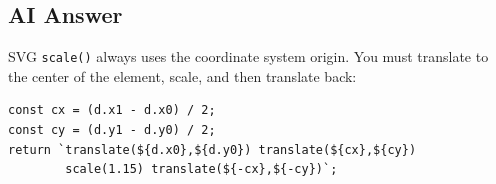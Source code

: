 \documentclass[11pt]{article}
\begin{document}
\subsection*{AI Answer}
SVG \texttt{scale()} always uses the coordinate system origin. You must translate to the center of the element, scale, and then translate back:
\begin{Verbatim}[fontsize=\small]
const cx = (d.x1 - d.x0) / 2;
const cy = (d.y1 - d.y0) / 2;
return `translate(${d.x0},${d.y0}) translate(${cx},${cy}) 
        scale(1.15) translate(${-cx},${-cy})`;
\end{Verbatim}
\end{document}
